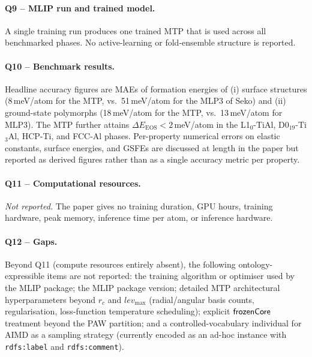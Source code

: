 \paragraph{Q9 -- MLIP run and trained model.}
A single training run produces one trained MTP that is used across
all benchmarked phases. No active-learning or fold-ensemble structure
is reported.


\paragraph{Q10 -- Benchmark results.}
Headline accuracy figures are MAEs of formation energies of (i)
surface structures (8\,meV/atom for the MTP, vs.\ 51\,meV/atom for
the MLP3 of Seko) and (ii) ground-state polymorphs (18\,meV/atom for
the MTP, vs.\ 13\,meV/atom for MLP3). The MTP further attains
$\Delta E_{\mathrm{EOS}} < 2$\,meV/atom in the L1$_0$-TiAl,
D0$_{19}$-Ti$_3$Al, HCP-Ti, and FCC-Al phases. Per-property numerical
errors on elastic constants, surface energies, and GSFEs are
discussed at length in the paper but reported as derived figures
rather than as a single accuracy metric per property.


\paragraph{Q11 -- Computational resources.}
\emph{Not reported.} The paper gives no training duration, GPU hours,
training hardware, peak memory, inference time per atom, or
inference hardware.


\paragraph{Q12 -- Gaps.}
Beyond Q11 (compute resources entirely absent), the following
ontology-expressible items are not reported: the training algorithm
or optimiser used by the MLIP package; the MLIP package version;
detailed MTP architectural hyperparameters beyond $r_c$ and
$\mathit{lev}_{\max}$ (radial/angular basis counts, regularisation,
loss-function temperature scheduling); explicit
$\mathsf{frozenCore}$ treatment beyond the PAW partition; and a
controlled-vocabulary individual for AIMD as a sampling strategy
(currently encoded as an ad-hoc instance with \texttt{rdfs:label} and
\texttt{rdfs:comment}).

